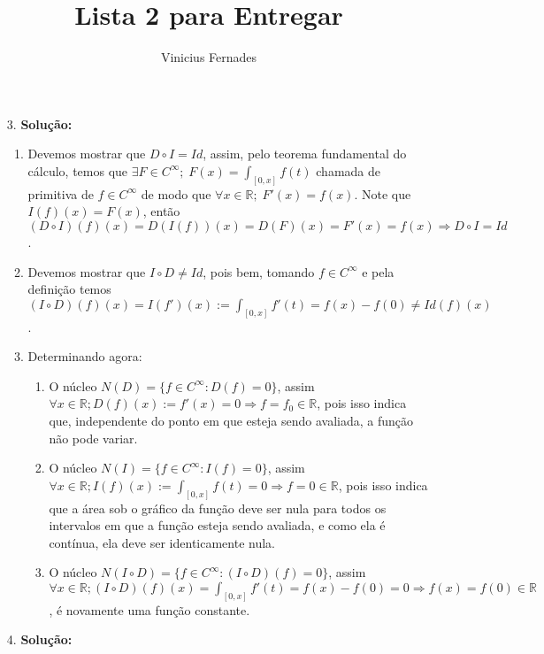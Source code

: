 \documentclass{article}
\begin{document}
	
	\title{Lista 2 para Entregar}
	\author{Vinicius Fernades}
	
	\maketitle
	
	\begin{enumerate}
		\item[3.] \textbf{Solução:}
		\begin{enumerate}
			\item Devemos mostrar que $D\circ I = Id$, assim, pelo teorema fundamental do cálculo, temos que $\exists F \in C^{\infty}; \; F(x) = \int_{[0,x]}f(t)$ chamada de primitiva de $f \in C^{\infty}$ de modo que $\forall x \in \mathbb{R}; \; F'(x) = f(x)$. Note que $I(f)(x) = F(x)$, então $(D\circ I)(f)(x) = D(I(f))(x) = D(F)(x) = F'(x) = f(x) \Rightarrow D\circ I = Id$.
			
			\item Devemos mostrar que $I \circ D \neq Id$, pois bem, tomando $f \in C^{\infty}$ e pela definição temos $(I \circ D) (f)(x) = I(f')(x) := \int_{[0,x]}f'(t) = f(x)-f(0) \neq Id(f)(x)$.
			
			\item Determinando agora:
				\begin{enumerate}
					\item O núcleo $N(D)=\{f \in C^{\infty}: D(f)=0 \}$, assim $\forall x  \in \mathbb{R}; D(f)(x) := f'(x) =0 \Rightarrow f = f_{0} \in \mathbb{R}$, pois isso indica que, independente do ponto em que esteja sendo avaliada, a função não pode variar.
					
					\item O núcleo $N(I)=\{f \in C^{\infty}: I(f)=0 \}$, assim $\forall x  \in \mathbb{R}; I(f)(x) := \int_{[0,x]}f(t) =0 \Rightarrow f = 0 \in \mathbb{R}$, pois isso indica que a área sob o gráfico da função deve ser nula para todos os intervalos em que a função esteja sendo avaliada, e como ela é contínua, ela deve ser identicamente nula.
					
					\item O núcleo $N(I\circ D)=\{f \in C^{\infty}: (I\circ D)(f)=0 \}$, assim $\forall x  \in \mathbb{R}; (I\circ D)(f)(x) = \int_{[0,x]}f'(t) = f(x) - f(0) = 0 \Rightarrow f(x) = f(0) \in \mathbb{R}$, é novamente uma função constante.
				\end{enumerate}
		\end{enumerate}
		
		\item[4.] \textbf{Solução:}
		

\end{enumerate}
\end{document}
